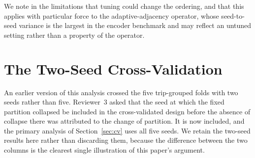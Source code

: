 \documentclass[journal]{IEEEtran}
\begin{document}
\begin{table}[!t]
  \caption{\textbf{[Settings taken from the originating papers; no search was performed]}~ Operator-specific configuration of every component compared in this study.}
  \label{tab:operator_config}
  \centering
  \footnotesize
\end{table}


We note in the limitations that tuning could change the ordering, and that this applies with particular force to the adaptive-adjacency operator, whose seed-to-seed variance is the largest in the encoder benchmark and may reflect an untuned setting rather than a property of the operator.

\section{The Two-Seed Cross-Validation}
\label{app:two_seed}
An earlier version of this analysis crossed the five trip-grouped folds with two seeds rather than five. Reviewer~3 asked that the seed at which the fixed partition collapsed be included in the cross-validated design before the absence of collapse there was attributed to the change of partition. It is now included, and the primary analysis of Section~\ref{sec:cv} uses all five seeds. We retain the two-seed results here rather than discarding them, because the difference between the two columns is the clearest single illustration of this paper's argument.
\end{document}
